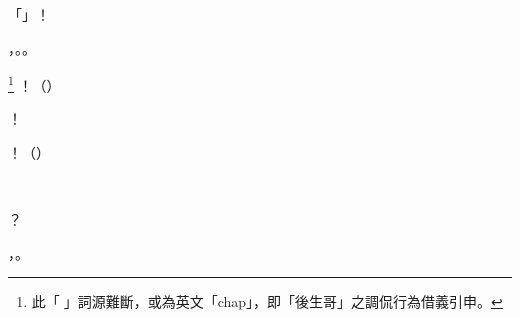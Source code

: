 \begin{dialogue}
「」！
\end{dialogue}
\begin{dialogue}
，。。
\end{dialogue}
\begin{dialogue}
\footnote{ 此「」詞源難斷，或為英文「chap」，即「後生哥」之調侃行為借義引申。
}
！（）
\end{dialogue}
\begin{dialogue}
！
\end{dialogue}
\begin{dialogue}
！（）
\end{dialogue}
\begin{dialogue}
！，！，！
\end{dialogue}
\begin{dialogue}
？
\end{dialogue}
\begin{dialogue}
，。
\end{dialogue}
